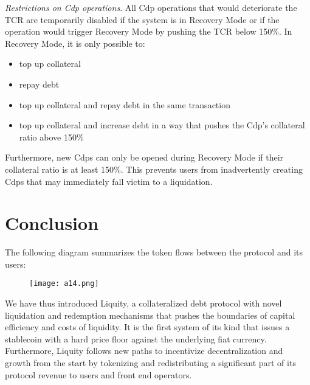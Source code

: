 \documentclass{article}
\begin{document}
\textit{Restrictions on Cdp operations}. All Cdp operations that would deteriorate the TCR are temporarily disabled if the system is in Recovery Mode or if the operation would trigger Recovery Mode by pushing the TCR below 150\%. In Recovery Mode, it is only possible to:
\begin{itemize}
    \item top up collateral
    \item repay debt
    \item top up collateral and repay debt in the same transaction 
    \item top up collateral and increase debt in a way that pushes the Cdp's collateral ratio above 150\%
\end{itemize}

Furthermore, new Cdps can only be opened during Recovery Mode if their collateral ratio is at least 150\%. This prevents users from inadvertently creating Cdps that may immediately fall victim to a liquidation.

\section{Conclusion}
The following diagram summarizes the token flows between the protocol and its users:\\

\begin{figure}[ht]
\centering
\texttt{[image: a14.png]}
\end{figure}

We have thus introduced Liquity, a collateralized debt protocol with novel liquidation and redemption mechanisms that pushes the boundaries of capital efficiency and costs of liquidity. It is the first system of its kind that issues a stablecoin with a hard price floor against the underlying fiat currency. Furthermore, Liquity follows new paths to incentivize decentralization and growth from the start by tokenizing and redistributing a significant part of its protocol revenue to users and front end operators. 
\end{document}
